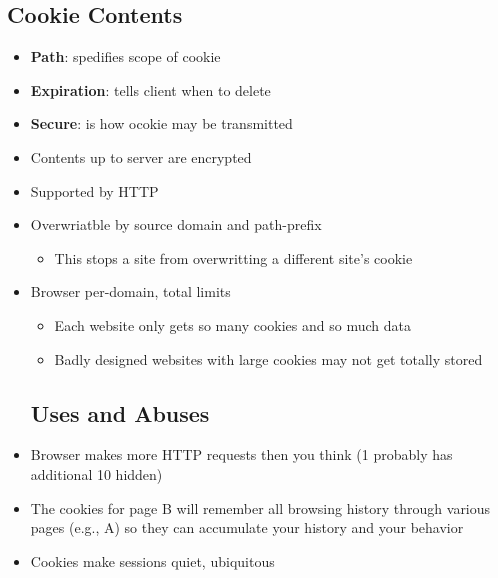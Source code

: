 \subsection{Cookie Contents}
\begin{itemize}
	\item \textbf{Path}: spedifies scope of cookie
	\item \textbf{Expiration}: tells client when to delete
	\item \textbf{Secure}: is how ocokie may be transmitted
	\item Contents up to server are encrypted
	\item Supported by HTTP
	\item Overwriatble by source domain and path-prefix
	\begin{itemize}
		\item This stops a site from overwritting a different site's cookie
	\end{itemize}
	\item Browser per-domain, total limits
	\begin{itemize}
		\item Each website only gets so many cookies and so much data
		\item Badly designed websites with large cookies may not get totally stored
	\end{itemize}
	\subsection{Uses and Abuses}
	\item Browser makes more HTTP requests then you think (1 probably has additional 10 hidden)
	\item The cookies for page B will remember all browsing history through various pages (e.g., A) so they can accumulate your history and your behavior
	\item Cookies make sessions quiet, ubiquitous
\end{itemize}